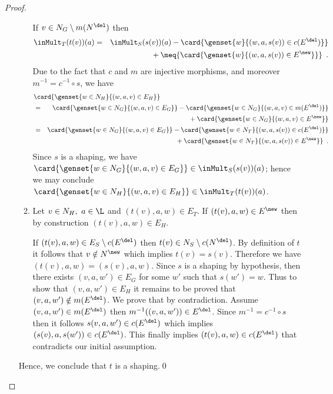 \begin{proof}
\begin{itemize}
\begin{enumerate}
  If $v \in N_G \setminus m(N^\del)$ then 
  \begin{eqnarray*}
  \inMult_{T}(t(v))(a) 
  & = & \inMult_{S}(s(v))(a)
         - \card{\genset{w}{(w,a,s(v)) \in c(E^\del)}} \\
  &   & {}+ \meq{\card{\genset{w}{(w,a,s(v)) \in E^\new}}} \enspace.
  \end{eqnarray*}
%
  Due to the fact that $c$ and $m$ are injective morphisms, and moreover
  $m^{-1}=c^{-1}\circ s$, we have
%
  \begin{eqnarray*}
  \lefteqn{\card{\genset{w \in N_H}{(w,a,v) \in E_H}}} \\
  & = & \card{\genset{w \in N_G}{(w,a,v) \in E_G}} 
         - \card{\genset{w \in N_G}{(w,a,v) \in m(E^\del)}} \\
  &   & {}+ \card{\genset{w \in N_G}{(w,a,v) \in E^\new}} \\
  & = & \card{\genset{w \in N_G}{(w,a,v) \in E_G}}
         - \card{\genset{w \in N_{T}}{(w,a,s(v)) \in c(E^\del)}} \\
  &   & {}+ \card{\genset{w \in N_{T}}{(w,a,s(v)) \in E^\new}} \enspace.
  \end{eqnarray*}
%
  Since $s$ is a shaping, we have $\card{\genset{w \in N_G}{(w,a,v) \in
  E_G}}\in \inMult_{S}(s(v))(a)$; hence we may conclude $\card{\genset{w \in
  N_H}{(w,a,v) \in E_H}}\in \inMult_{T}(t(v))(a)$.
%
\item Let $v \in N_H, \ a \in \L$ and $(t(v),a,w) \in E_{T}$.  If
  $(t(v),a,w) \in E^\new$ then by construction $(t(v),a,w) \in E_H$.
  
  If $(t(v),a,w) \in E_{S} \setminus c(E^\del)$ then $t(v) \in N_{S}
  \setminus c(N^\del)$.  By definition of $t$ it follows that $v \notin
  N^\new$ which implies $t(v)=s(v)$.  Therefore we have
  $(t(v),a,w)=(s(v),a,w)$.  Since $s$ is a shaping by hypothesis, then there
  exists $(v,a,w') \in E_G$ for some $w'$ such that $s(w')=w$.  Thus to show
  that $(v,a,w') \in E_H$ it remains to be proved that $(v,a,w') \notin
  m(E^\del)$.  We prove that by contradiction. Assume $(v,a,w') \in m(E^\del)$
  then $m^{-1}((v,a,w')) \in E^\del$.  Since $m^{-1}=c^{-1}\circ s$ then it
  follows $s(v,a,w') \in c(E^\del)$ which implies $(s(v),a,s(w')) \in
  c(E^\del)$. This finally implies $(t(v),a,w) \in c(E^\del)$ that contradicts
  our initial assumption.
 \end{enumerate}
%
 Hence, we conclude that $t$ is a shaping.\qed
\end{itemize}
\end{proof}

